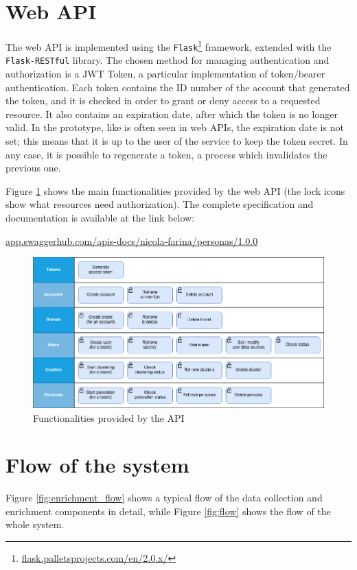 \section{Web API}
The web API is implemented using the \texttt{Flask}\footnote{\url{flask.palletsprojects.com/en/2.0.x/}} framework, extended with the \texttt{Flask-RESTful} library. The chosen method for managing authentication and authorization is a JWT Token, a particular implementation of token/bearer authentication. Each token contains the ID number of the account that generated the token, and it is checked in order to grant or deny access to a requested resource. It also contains an expiration date, after which the token is no longer valid. In the prototype, like is often seen in web APIs, the expiration date is not set; this means that it is up to the user of the service to keep the token secret. In any case, it is possible to regenerate a token, a process which invalidates the previous one.

Figure \ref{fig:api_funcs} shows the main functionalities provided by the web API (the lock icons show what resources need authorization). The complete specification and documentation is available at the link below:
\begin{center}
\url{app.swaggerhub.com/apis-docs/nicola-farina/personas/1.0.0}
\end{center}

\begin{figure}[h]
\centering
\includegraphics[width=1\textwidth]{img/APIfuncs.png}
\caption{Functionalities provided by the API}
\label{fig:api_funcs}
\end{figure}

\section{Flow of the system}
Figure \ref{fig:enrichment_flow} shows a typical flow of the data collection and enrichment components in detail, while Figure \ref{fig:flow} shows the flow of the whole system. 

